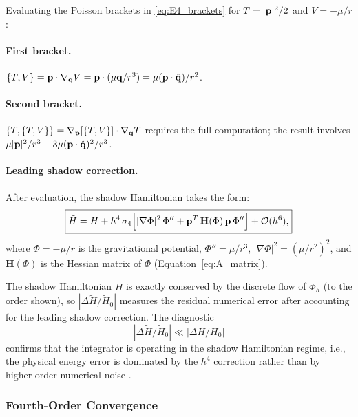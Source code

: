 Evaluating the Poisson brackets in \eqref{eq:E4_brackets} for
$T = |\mathbf{p}|^2/2$ and $V = -\mu/r$:

\paragraph{First bracket.}
$\{T,V\} = \mathbf{p} \cdot \nabla_{\mathbf{q}} V = \mathbf{p} \cdot (\mu\mathbf{q}/r^3)
= \mu(\mathbf{p}\cdot\hat{\mathbf{q}})/r^2$.

\paragraph{Second bracket.}
$\{T,\{T,V\}\} = \nabla_{\mathbf{p}}[\{T,V\}] \cdot \nabla_{\mathbf{q}} T$
requires the full computation; the result involves
$\mu|\mathbf{p}|^2/r^3 - 3\mu(\mathbf{p}\cdot\hat{\mathbf{q}})^2/r^3$.

\paragraph{Leading shadow correction.}
After evaluation, the shadow Hamiltonian takes the form:
\begin{equation}
  \boxed{
  \tilde{H} = H + h^4\,\sigma_4
  \Bigl[
    |\nabla\Phi|^2\,\Phi'' + \mathbf{p}^T\,\mathbf{H}(\Phi)\,\mathbf{p}\,\Phi''
  \Bigr]
  + \mathcal{O}(h^6),
  }
  \label{eq:shadow_hamiltonian}
\end{equation}
where $\Phi = -\mu/r$ is the gravitational potential,
$\Phi'' = \mu/r^3$,
$|\nabla\Phi|^2 = (\mu/r^2)^2$, and
$\mathbf{H}(\Phi)$ is the Hessian matrix of $\Phi$
(Equation~\ref{eq:A_matrix}).

The shadow Hamiltonian $\tilde{H}$ is exactly conserved by the
discrete flow of $\Phi_h$ (to the order shown), so
$|\Delta\tilde{H}/\tilde{H}_0|$ measures the residual numerical
error after accounting for the leading shadow correction.
The diagnostic
\begin{equation}
  |\Delta\tilde{H}/\tilde{H}_0| \ll |\Delta H/H_0|
  \label{eq:shadow_diagnostic}
\end{equation}
confirms that the integrator is operating in the shadow
Hamiltonian regime, i.e., the physical energy error is
dominated by the $h^4$ correction rather than by
higher-order numerical noise
\citep{HairerLubichWanner2006,Zeebe2023}.

\subsubsection{Fourth-Order Convergence}
\label{sec:fourth_order}

